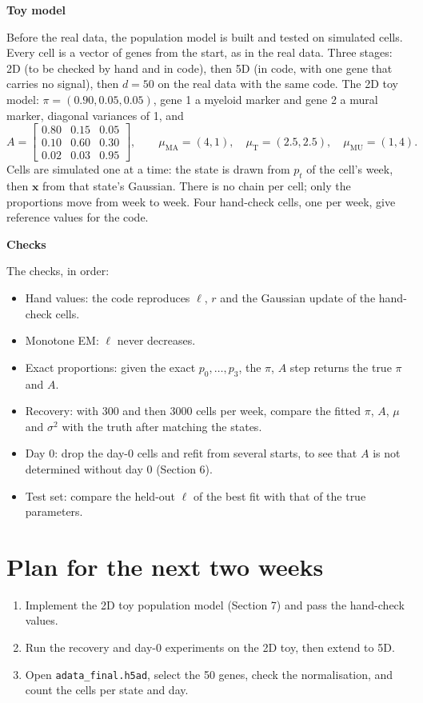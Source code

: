 \documentclass[10pt,a4paper]{article}
\newcommand{\sub}[1]{\vspace{1pt}\textbf{\textcolor{gray!80!black}{#1}}\par}
\begin{document}
\sub{Toy model}
Before the real data, the population model is built and tested on simulated cells. Every cell is a vector of genes from the start, as in the real data. Three stages: 2D (to be checked by hand and in code), then 5D (in code, with one gene that carries no signal), then $d = 50$ on the real data with the same code. The 2D toy model: $\pi = (0.90, 0.05, 0.05)$, gene 1 a myeloid marker and gene 2 a mural marker, diagonal variances of 1, and
\[
A = \begin{bmatrix} 0.80 & 0.15 & 0.05 \\ 0.10 & 0.60 & 0.30 \\ 0.02 & 0.03 & 0.95 \end{bmatrix}, \qquad
\mu_{\mathrm{MA}} = (4, 1), \quad \mu_{\mathrm{T}} = (2.5, 2.5), \quad \mu_{\mathrm{MU}} = (1, 4).
\]
Cells are simulated one at a time: the state is drawn from $p_t$ of the cell's week, then $\mathbf{x}$ from that state's Gaussian. There is no chain per cell; only the proportions move from week to week. Four hand-check cells, one per week, give reference values for the code.

\sub{Checks}
The checks, in order:
\begin{itemize}
  \item Hand values: the code reproduces $\ell$, $r$ and the Gaussian update of the hand-check cells.
  \item Monotone EM: $\ell$ never decreases.
  \item Exact proportions: given the exact $p_0, \ldots, p_3$, the $\pi$, $A$ step returns the true $\pi$ and $A$.
  \item Recovery: with 300 and then 3000 cells per week, compare the fitted $\pi$, $A$, $\mu$ and $\sigma^2$ with the truth after matching the states.
  \item Day 0: drop the day-0 cells and refit from several starts, to see that $A$ is not determined without day 0 (Section 6).
  \item Test set: compare the held-out $\ell$ of the best fit with that of the true parameters.
\end{itemize}

\section{Plan for the next two weeks}

\begin{enumerate}
  \item Implement the 2D toy population model (Section 7) and pass the hand-check values.
  \item Run the recovery and day-0 experiments on the 2D toy, then extend to 5D.
  \item Open \texttt{adata\_final.h5ad}, select the 50 genes, check the normalisation, and count the cells per state and day.
\end{enumerate}
\end{document}

